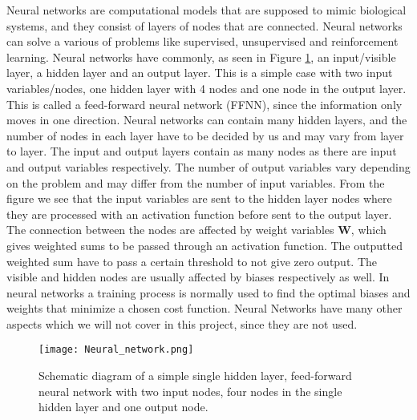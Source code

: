 \documentclass[12pt,a4paper,english]{article}
\begin{document}
Neural networks are computational models that are supposed to mimic biological systems, and they consist of layers of nodes that are connected. Neural networks can solve a various of problems like supervised, unsupervised and reinforcement learning. Neural networks have commonly, as seen in Figure \ref{fig:Neural_network}, an input/visible layer, a hidden layer and an output layer. This is a simple case with two input variables/nodes, one hidden layer with 4 nodes and one node in the output layer. This is called a feed-forward neural network (FFNN), since the information only moves in one direction. Neural networks can contain many hidden layers, and the number of nodes in each layer have to be decided by us and may vary from layer to layer. The input and output layers contain as many nodes as there are input and output variables respectively. The number of output variables vary depending on the problem and may differ from the number of input variables. From the figure we see that the input variables are sent to the hidden layer nodes where they are processed with an activation function before sent to the output layer. The connection between the nodes are affected by weight variables \textbf{W}, which gives weighted sums to be passed through an activation function. The outputted weighted sum have to pass a certain threshold to not give zero output. The visible and hidden nodes are usually affected by biases respectively as well. In neural networks a training process is normally used to find the optimal biases and weights that minimize a chosen cost function. Neural Networks have many other aspects which we will not cover in this project, since they are not used.

\begin{figure}[htbp]
	\centering\texttt{[image: Neural\_network.png]}
	\caption{Schematic diagram of a simple single hidden layer, feed-forward neural network with two input nodes, four nodes in the single hidden layer and one output node.\label{fig:Neural_network}}
\end{figure} 
\end{document}
